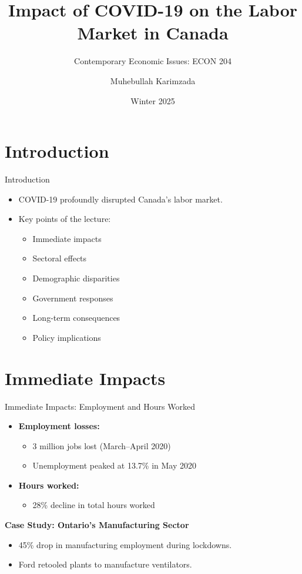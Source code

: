 \documentclass{beamer}
\title{Impact of COVID-19 on the Labor Market in Canada}
\subtitle{Contemporary Economic Issues: ECON 204}
\author{Muhebullah Karimzada}
\date{Winter 2025}
\begin{document}
\frame{\titlepage}

\section{Introduction}
\begin{frame}{Introduction}
    \begin{itemize}
        \item COVID-19 profoundly disrupted Canada's labor market.
        \item Key points of the lecture:
        \begin{itemize}
            \item Immediate impacts
            \item Sectoral effects
            \item Demographic disparities
            \item Government responses
            \item Long-term consequences
            \item Policy implications
        \end{itemize}
    \end{itemize}
\end{frame}

\section{Immediate Impacts}
\begin{frame}{Immediate Impacts: Employment and Hours Worked}
    \begin{itemize}
        \item \textbf{Employment losses:} 
        \begin{itemize}
            \item 3 million jobs lost (March–April 2020)
            \item Unemployment peaked at 13.7\% in May 2020
        \end{itemize}
        \item \textbf{Hours worked:}
        \begin{itemize}
            \item 28\% decline in total hours worked
        \end{itemize}
    \end{itemize}
    \textbf{Case Study: Ontario's Manufacturing Sector}
    \begin{itemize}
        \item 45\% drop in manufacturing employment during lockdowns.
        \item Ford retooled plants to manufacture ventilators.
    \end{itemize}
\end{frame}
\end{document}
